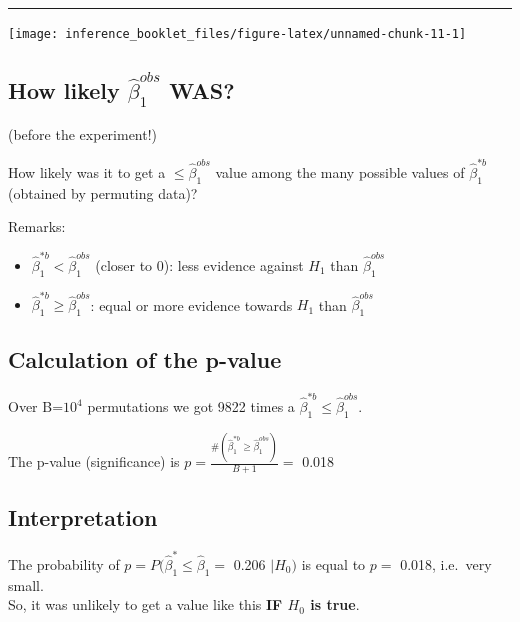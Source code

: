 \documentclass[]{article}
\providecommand{\tightlist}{%
  \setlength{\itemsep}{0pt}\setlength{\parskip}{0pt}}
\begin{document}
\begin{center}\rule{0.5\linewidth}{\linethickness}\end{center}

\begin{center}\texttt{[image: inference\_booklet\_files/figure-latex/unnamed-chunk-11-1]} \end{center}

\hypertarget{how-likely-hatbeta_1-obs-was}{%
\subsection{\texorpdfstring{How likely \(\hat{\beta}_1 ^{obs}\)
WAS?}{How likely \textbackslash hat\{\textbackslash beta\}\_1 \^{}\{obs\} WAS?}}\label{how-likely-hatbeta_1-obs-was}}

(before the experiment!)

How likely was it to get a \(\leq \hat{\beta}_1 ^{obs}\) value among the
many possible values of \(\hat{\beta}_1 ^{*b}\) (obtained by permuting
data)?

Remarks:

\begin{itemize}
\tightlist
\item
  \(\hat{\beta}_1 ^{* b}< \hat{\beta}_1 ^{obs}\) (closer to 0): less
  evidence against \(H_1\) than \(\hat{\beta}_1 ^{obs}\)
\item
  \(\hat{\beta}_1 ^{* b} \geq \hat{\beta}_1 ^{obs}\): equal or more
  evidence towards \(H_1\) than \(\hat{\beta}_1 ^{obs}\)
\end{itemize}

\hypertarget{calculation-of-the-p-value}{%
\subsection{Calculation of the
p-value}\label{calculation-of-the-p-value}}

Over B=\ensuremath{10^{4}} permutations we got 9822 times a
\(\hat{\beta}_1 ^{* b} \leq \hat{\beta}_1 ^{obs}\).

The p-value (significance) is
\(p=\frac{\# (\hat{\beta}_1 ^{* b} \geq \hat{\beta}_1 ^{obs})}{B + 1} =\)
0.018

\hypertarget{interpretation}{%
\subsection{Interpretation}\label{interpretation}}

The probability of \(p=P (\hat{\beta}_1 ^ * \leq \hat{\beta}_1=\) 0.206
\(| H_0)\) is equal to \(p =\) 0.018, i.e.~very small.\\
So, it was unlikely to get a value like this \textbf{IF \(H_0\) is
true}.
\end{document}
